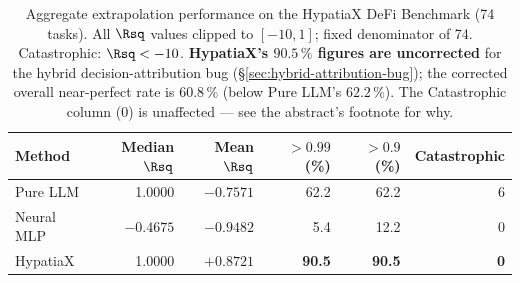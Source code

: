 \begin{table}[h]
\centering
\caption{Aggregate extrapolation performance on the HypatiaX DeFi Benchmark (74 tasks).
All $\Rsq$ values clipped to $[-10,1]$; fixed denominator of 74.
Catastrophic: $\Rsq < -10$. \textbf{HypatiaX's $90.5\,\%$ figures are
uncorrected} for the hybrid decision-attribution bug
(\S\ref{sec:hybrid-attribution-bug}); the corrected overall near-perfect
rate is $60.8\,\%$ (below Pure LLM's $62.2\,\%$). The Catastrophic column
(0) is unaffected --- see the abstract's footnote for why.}
\label{tab:main_results}
\begin{tabular}{lrrrrr}
\toprule
Method & Median $\Rsq$ & Mean $\Rsq$ & $>0.99$ (\%) & $>0.9$ (\%) & Catastrophic \\
\midrule
Pure LLM      & 1.0000 & $-0.7571$ & 62.2 & 62.2 & 6 \\
Neural MLP    & $-0.4675$ & $-0.9482$ & 5.4  & 12.2 & 0 \\
HypatiaX      & 1.0000 & $+0.8721$ & \textbf{90.5} & \textbf{90.5} & \textbf{0} \\
\bottomrule
\end{tabular}
\end{table}
